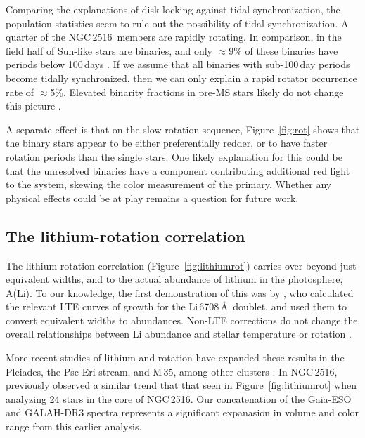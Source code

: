 \documentclass[12pt,twocolumn,tighten]{aastex63}
\newcommand{\cn}{NGC\,2516} %
\begin{document}
Comparing the explanations of disk-locking against tidal
synchronization, the population statistics seem to rule out the
possibility of tidal synchronization.  A quarter of the \cn\ members
are rapidly rotating.  In comparison, in the field half of Sun-like
stars are binaries, and only $\approx$9\% of these binaries have
periods below 100\,days \citep{raghavan_survey_2010}.  If we assume
that all binaries with sub-100\,day periods become tidally
synchronized, then we can only explain a rapid rotator occurrence rate
of $\approx$5\%.  Elevated binarity fractions in pre-MS stars likely
do not change this picture \citep[see Section~4.4
of][]{duchene_stellar_2013}.

A separate effect is that on the slow rotation sequence,
Figure~\ref{fig:rot} shows that the binary stars appear to be either
preferentially redder, or to have faster rotation periods than the
single stars.  One likely explanation for this could be that the
unresolved binaries have a component contributing additional red light
to the system, skewing the color measurement of the primary.  Whether
any physical effects could be at play remains a question for future
work.


\subsection{The lithium-rotation correlation}
\label{discussion:lithium}

The lithium-rotation correlation (Figure~\ref{fig:lithiumrot}) carries
over beyond just equivalent widths, and to the actual abundance of
lithium in the photosphere, A(Li).  To our knowledge, the first
demonstration of this was by \citet{soderblom_evolution_1993}, who
calculated the relevant LTE curves of growth for the Li\,6708\,\AA\
doublet, and used them to convert equivalent widths to abundances.
Non-LTE corrections do
not change the overall relationships between Li abundance and stellar
temperature or rotation \citep{carlsson_1994,lind_departures_2009}.

More recent studies of lithium and rotation have expanded these
results in the Pleiades, the Psc-Eri stream, and M\,35, among other
clusters
\citep{bouvier_pleiades_lirot_2018,arancibia_2020,jeffries_m35_li_2020,hawkins_2020}.
In \cn, \citet{jeffries_rotation_1998} previously observed a similar
trend that that seen in Figure~\ref{fig:lithiumrot} when analyzing 24
stars in the core of \cn.  Our concatenation of the
Gaia-ESO and GALAH-DR3
spectra represents a significant expanasion in volume and color range
from this earlier analysis.
\end{document}
